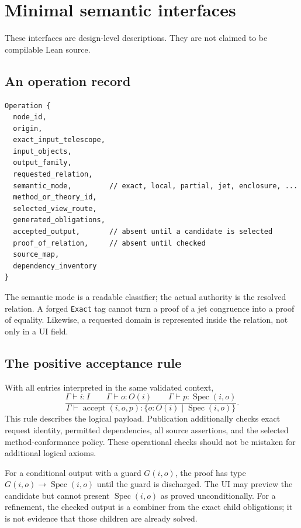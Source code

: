 \documentclass[11pt,letterpaper]{article}
\newcommand{\code}[1]{\nolinkurl{#1}}
\newcommand{\Spec}{\operatorname{Spec}}
\theoremstyle{definition}
\theoremstyle{remark}
\begin{document}
\appendix
\section{Minimal semantic interfaces}
\label{app:interfaces}

These interfaces are design-level descriptions. They are not claimed to be
compilable Lean source.

\subsection{An operation record}
\begin{lstlisting}
Operation {
  node_id,
  origin,
  exact_input_telescope,
  input_objects,
  output_family,
  requested_relation,
  semantic_mode,         // exact, local, partial, jet, enclosure, ...
  method_or_theory_id,
  selected_view_route,
  generated_obligations,
  accepted_output,       // absent until a candidate is selected
  proof_of_relation,     // absent until checked
  source_map,
  dependency_inventory
}
\end{lstlisting}
The semantic mode is a readable classifier; the actual authority is the resolved
relation. A forged \code{Exact} tag cannot turn a proof of a jet congruence into
a proof of equality. Likewise, a requested domain is represented inside the
relation, not only in a UI field.

\subsection{The positive acceptance rule}
With all entries interpreted in the same validated context,
\[
 \frac{\Gamma\vdash i:I\qquad
       \Gamma\vdash o:O(i)\qquad
       \Gamma\vdash p:\Spec(i,o)}
      {\Gamma\vdash\operatorname{accept}(i,o,p):
         \{o:O(i)\mid\Spec(i,o)\}}.
\]
This rule describes the logical payload. Publication additionally checks exact
request identity, permitted dependencies, all source assertions, and the
selected method-conformance policy. These operational checks should not be
mistaken for additional logical axioms.

For a conditional output with a guard $G(i,o)$, the proof has type
$G(i,o)\to\Spec(i,o)$ until the guard is discharged. The UI may preview the
candidate but cannot present $\Spec(i,o)$ as proved unconditionally. For a
refinement, the checked output is a combiner from the exact child obligations;
it is not evidence that those children are already solved.

\end{document}
